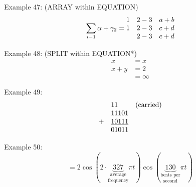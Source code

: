 \documentclass{book}
\begin{document}
\noindent Example 47: (ARRAY within EQUATION)
\begin{equation}
	\sum_{i-1}\alpha + \gamma_{2} = \begin{array}{@{}ccc@{}}
		1 & 2-3 & a+b \\
		1 & 2-3 & c+d \\
		  & 2-3 & c+d
	\end{array}
\end{equation}

\noindent Example 48: (SPLIT within EQUATION*)
\begin{equation*}
	\begin{split}
		x     & = x      \\
		x + y & =2       \\
		      & = \infty
	\end{split}
\end{equation*}

\noindent Example 49:
\begin{equation*}
	\begin{array}{@{}lll@{}}
		  & 11                & \mbox{(carried)} \\
		  & 11101             &                  \\
		+ & \underline{10111} &                  \\
		  & 01011             &
	\end{array}
\end{equation*}

\noindent Example 50:
\[ = 2\cos (2\cdot
	\underset{\mbox{frequency}}{\underset{\mbox{average}}{\underbrace{327}}} \pi
	t) \cos
	(\underset{\mbox{second}}{\underset{\mbox{beats per}}{\underbrace{130}}} \pi
	t)\]
\end{document}
